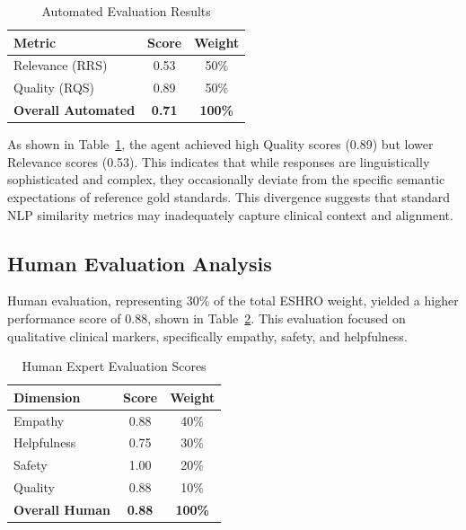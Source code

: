 \documentclass[sigconf]{acmart}
\begin{document}
\begin{table}[htbp]
\caption{Automated Evaluation Results}
\label{table1}
\begin{center}
\begin{tabular}{lcc}
\toprule
\textbf{Metric} & \textbf{Score} & \textbf{Weight} \\
\midrule
Relevance (RRS) & 0.53 & 50\% \\
Quality (RQS) & 0.89 & 50\% \\
\midrule
\textbf{Overall Automated} & \textbf{0.71} & \textbf{100\%} \\
\bottomrule
\end{tabular}
\end{center}
\end{table}

As shown in Table~\ref{table1}, the agent achieved high Quality scores (0.89) but lower Relevance scores (0.53). This indicates that while responses are linguistically sophisticated and complex, they occasionally deviate from the specific semantic expectations of reference gold standards. This divergence suggests that standard NLP similarity metrics may inadequately capture clinical context and alignment.

\subsection{Human Evaluation Analysis}

Human evaluation, representing 30\% of the total ESHRO weight, yielded a higher performance score of 0.88, shown in Table~\ref{table2}. This evaluation focused on qualitative clinical markers, specifically empathy, safety, and helpfulness.

\begin{table}[htbp]
\caption{Human Expert Evaluation Scores}
\label{table2}
\begin{center}
\begin{tabular}{lcc}
\toprule
\textbf{Dimension} & \textbf{Score} & \textbf{Weight} \\
\midrule
Empathy & 0.88 & 40\% \\
Helpfulness & 0.75 & 30\% \\
Safety & 1.00 & 20\% \\
Quality & 0.88 & 10\% \\
\midrule
\textbf{Overall Human} & \textbf{0.88} & \textbf{100\%} \\
\bottomrule
\end{tabular}
\end{center}
\end{table}
\end{document}
